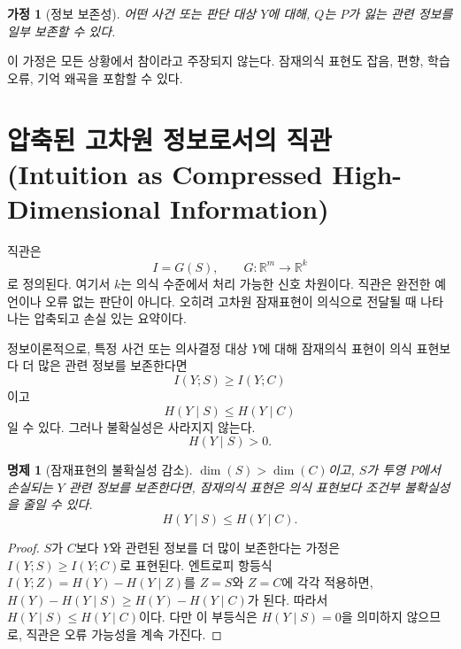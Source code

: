 \documentclass[11pt]{article}
\newtheorem{proposition}{명제}
\newtheorem{assumption}{가정}
\theoremstyle{remark}
\begin{document}
\begin{assumption}[정보 보존성]
어떤 사건 또는 판단 대상 $Y$에 대해, $Q$는 $P$가 잃는 관련 정보를 일부
보존할 수 있다.
\end{assumption}

이 가정은 모든 상황에서 참이라고 주장되지 않는다. 잠재의식 표현도 잡음,
편향, 학습 오류, 기억 왜곡을 포함할 수 있다.

\section{압축된 고차원 정보로서의 직관 (Intuition as Compressed High-Dimensional Information)}

직관은
\begin{equation}
  I=G(S), \qquad G:\mathbb{R}^m\to\mathbb{R}^k
\end{equation}
로 정의된다. 여기서 $k$는 의식 수준에서 처리 가능한 신호 차원이다.
직관은 완전한 예언이나 오류 없는 판단이 아니다. 오히려 고차원 잠재표현이
의식으로 전달될 때 나타나는 압축되고 손실 있는 요약이다.

정보이론적으로, 특정 사건 또는 의사결정 대상 $Y$에 대해 잠재의식 표현이
의식 표현보다 더 많은 관련 정보를 보존한다면
\begin{equation}
  I(Y;S)\ge I(Y;C)
\end{equation}
이고
\begin{equation}
  H(Y\mid S)\le H(Y\mid C)
\end{equation}
일 수 있다. 그러나 불확실성은 사라지지 않는다.
\begin{equation}
  H(Y\mid S)>0.
\end{equation}

\begin{proposition}[잠재표현의 불확실성 감소]
$\dim(S)>\dim(C)$이고, $S$가 투영 $P$에서 손실되는 $Y$ 관련 정보를 보존한다면,
잠재의식 표현은 의식 표현보다 조건부 불확실성을 줄일 수 있다.
\begin{equation}
  H(Y\mid S)\le H(Y\mid C).
\end{equation}
\end{proposition}

\begin{proof}
$S$가 $C$보다 $Y$와 관련된 정보를 더 많이 보존한다는 가정은
$I(Y;S)\ge I(Y;C)$로 표현된다. 엔트로피 항등식
$I(Y;Z)=H(Y)-H(Y\mid Z)$를 $Z=S$와 $Z=C$에 각각 적용하면,
$H(Y)-H(Y\mid S)\ge H(Y)-H(Y\mid C)$가 된다. 따라서
$H(Y\mid S)\le H(Y\mid C)$이다. 다만 이 부등식은
$H(Y\mid S)=0$을 의미하지 않으므로, 직관은 오류 가능성을 계속 가진다.
\end{proof}
\end{document}

